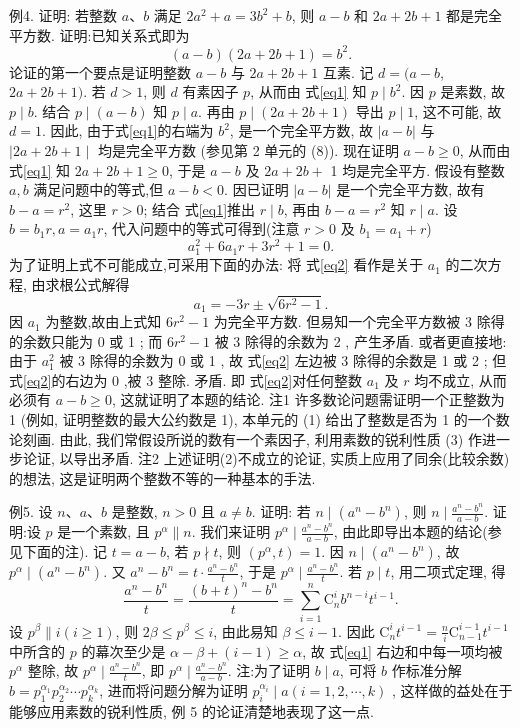 例4. 证明: 若整数 $a 、 b$ 满足 $2 a^2+a=3 b^2+b$, 则 $a-b$ 和 $2 a+2 b+1$ 都是完全平方数.
证明:已知关系式即为
$$
(a-b)(2 a+2 b+1)=b^2 . \label{eq1}
$$
论证的第一个要点是证明整数 $a-b$ 与 $2 a+2 b+1$ 互素.
记 $d=(a-b$, $2 a+2 b+1)$. 若 $d>1$, 则 $d$ 有素因子 $p$, 从而由 式\ref{eq1} 知 $p \mid b^2$. 因 $p$ 是素数, 故 $p \mid b$. 结合 $p \mid(a-b)$ 知 $p \mid a$. 再由 $p \mid(2 a+2 b+1)$ 导出 $p \mid 1$, 这不可能, 故 $d=1$. 因此, 由于式\ref{eq1}的右端为 $b^2$, 是一个完全平方数, 故 $|a-b|$ 与 $\mid 2 a+2 b+ 1 \mid$ 均是完全平方数 (参见第 2 单元的 (8)).
现在证明 $a-b \geqslant 0$, 从而由 式\ref{eq1} 知 $2 a+2 b+1 \geqslant 0$, 于是 $a-b$ 及 $2 a+2 b+$ 1 均是完全平方.
假设有整数 $a, b$ 满足问题中的等式,但 $a-b<0$. 因已证明 $|a-b|$ 是一个完全平方数, 故有 $b-a=r^2$, 这里 $r>0$; 结合 式\ref{eq1}推出 $r \mid b$, 再由 $b-a=r^2$ 知 $r \mid a$. 设 $b=b_1 r, a=a_1 r$, 代入问题中的等式可得到(注意 $r>0$ 及 $b_1= a_1+r$)
$$
a_1^2+6 a_1 r+3 r^2+1=0 . \label{eq2}
$$
为了证明上式不可能成立,可采用下面的办法:
将 式\ref{eq2} 看作是关于 $a_1$ 的二次方程, 由求根公式解得
$$
a_1=-3 r \pm \sqrt{6 r^2-1} .
$$
因 $a_1$ 为整数,故由上式知 $6 r^2-1$ 为完全平方数.
但易知一个完全平方数被 3 除得的余数只能为 0 或 1 ; 而 $6 r^2-1$ 被 3 除得的余数为 2 , 产生矛盾.
或者更直接地: 由于 $a_1^2$ 被 3 除得的余数为 0 或 1 , 故 式\ref{eq2} 左边被 3 除得的余数是 1 或 2 ; 但 式\ref{eq2}的右边为 0 ,被 3 整除.
矛盾.
即 式\ref{eq2}对任何整数 $a_1$ 及 $r$ 均不成立, 从而必须有 $a-b \geqslant 0$, 这就证明了本题的结论.
注1 许多数论问题需证明一个正整数为 1 (例如, 证明整数的最大公约数是 1), 本单元的 (1) 给出了整数是否为 1 的一个数论刻画.
由此, 我们常假设所说的数有一个素因子, 利用素数的锐利性质 (3) 作进一步论证, 以导出矛盾.
注2 上述证明(2)不成立的论证, 实质上应用了同余(比较余数) 的想法, 这是证明两个整数不等的一种基本的手法.



例5. 设 $n 、 a 、 b$ 是整数, $n>0$ 且 $a \neq b$. 证明: 若 $n \mid\left(a^n-b^n\right)$, 则 $n \mid \frac{a^n-b^n}{a-b}$.
证明:设 $p$ 是一个素数, 且 $p^\alpha \| n$. 我们来证明 $p^\alpha \mid \frac{a^n-b^n}{a-b}$, 由此即导出本题的结论(参见下面的注).
记 $t=a-b$, 若 $p \nmid t$, 则 $\left(p^\alpha, t\right)=1$. 因 $n \mid\left(a^n-b^n\right)$, 故 $p^\alpha \mid\left(a^n-b^n\right)$. 又 $a^n-b^n=t \cdot \frac{a^n-b^n}{t}$, 于是 $p^\alpha \mid \frac{a^n-b^n}{t}$.
若 $p \mid t$, 用二项式定理, 得
$$
\frac{a^n-b^n}{t}=\frac{(b+t)^n-b^n}{t}=\sum_{i=1}^n \mathrm{C}_n^i b^{n-i} t^{i-1} . \label{eq1}
$$
设 $p^\beta \| i(i \geqslant 1)$, 则 $2 \beta \leqslant p^\beta \leqslant i$, 由此易知 $\beta \leqslant i-1$. 因此 $\mathrm{C}_n^i t^{i-1}=\frac{n}{i} \mathrm{C}_{n-1}^{i-1} t^{i-1}$ 中所含的 $p$ 的幕次至少是 $\alpha-\beta+(i-1) \geqslant \alpha$, 故 式\ref{eq1} 右边和中每一项均被 $p^\alpha$ 整除, 故 $p^\alpha \mid \frac{a^n-b^n}{t}$, 即 $p^\alpha \mid \frac{a^n-b^n}{a-b}$.
注:为了证明 $b \mid a$, 可将 $b$ 作标准分解 $b=p_1^{\alpha_1} p_2^{\alpha_2} \cdots p_k^{\alpha_k}$, 进而将问题分解为证明 $p_i^{\alpha_i} \mid a(i=1,2, \cdots, k)$ , 这样做的益处在于能够应用素数的锐利性质, 例 5 的论证清楚地表现了这一点.



